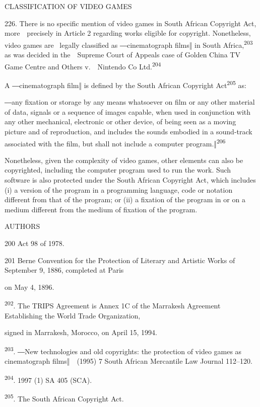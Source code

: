 \documentclass[
]{article}
\begin{document}
{CLASSIFICATION OF VIDEO GAMES}

{226. }{There is no specific mention of video games in South African
}{Copyright Act}{, more~~precisely in Article 2 regarding works eligible
for copyright. Nonetheless, video games are }{~legally classified as
―cinematograph films‖ in South Africa,}\textsuperscript{{203 }}{as was
decided in the~~Supreme Court of Appeals case of }{Golden China TV Game
Centre and Others v.~~Nintendo Co Ltd.}\textsuperscript{{204}}

{A ―cinematograph film‖ is defined by the South African }{Copyright
Act}\textsuperscript{{205 }}{as:}

{―}{any fixation or storage by any means whatsoever on film or any other
material of data, signals or a sequence of images capable, when used in
conjunction with any other mechanical, electronic or other device, of
being seen as a moving picture and of reproduction, and includes the
sounds embodied in a sound-track associated with the film, }{but shall
not include a computer program.‖}\textsuperscript{{206}}

{Nonetheless, given the complexity of video games, other elements can
also be copyrighted, including the computer program used to run the
work. Such software is also protected under the South African
}{Copyright Act}{, which includes (i) a version of the program in a
programming language, code or notation different from that of the
program; or (ii) a fixation of the program in or on a medium different
from the medium of fixation of the program.}

{AUTHORS}

{200 }{Act 98 of 1978.}

{201 }{Berne Convention for the Protection of Literary and Artistic
Works }{of September 9, 1886, completed at Paris}

{on May 4, 1896.}

\textsuperscript{{202}}{. The TRIPS Agreement is Annex 1C of the
}{Marrakesh Agreement Establishing the World Trade Organization}{,}

{signed in Marrakesh, Morocco, on April 15, 1994.}

\textsuperscript{{203}}{. }{―}{New technologies and old copyrights: the
protection of video games as cinematograph films}{‖~~}{(1995) 7 }{South
African Mercantile Law Journal }{112}{--}{120.}

\textsuperscript{{204}}{. 1997 (1) SA 405 (SCA).}

\textsuperscript{{205}}{. The South African }{Copyright Act}{.}
\end{document}
